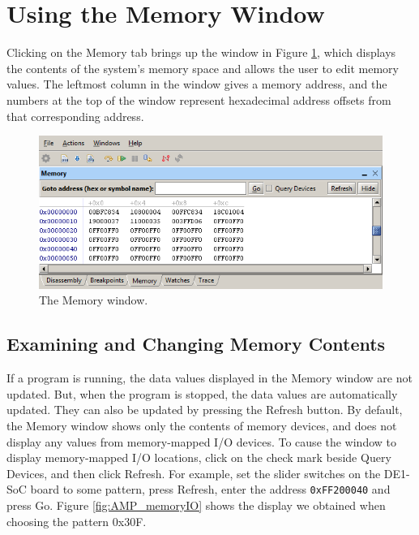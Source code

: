 \documentclass[11pt, twoside, pdftex]{article}
\begin{document}
\section{Using the Memory Window}

Clicking on the {\sf Memory} tab brings up the window in 
Figure \ref{fig:AMP_memorywindow}, which displays the contents
of the system's memory space and allows the user to edit memory
values. The leftmost column in the window gives a memory address,
and the numbers at the top of the window represent hexadecimal
address offsets from that corresponding address. 

\begin{figure}[H]
   \begin{center}
      \includegraphics[scale=0.6]{screenshots/figure36.png}
   \end{center}
   \caption{The Memory window.} 
   \label{fig:AMP_memorywindow}
\end{figure}

\subsection{Examining and Changing Memory Contents}

If a program is running, the data values displayed in the
Memory window are not updated. But, when the program is stopped,
the data values are automatically updated. They can also be
updated by pressing the {\sf Refresh} button. 
By default, the Memory window shows only the contents of memory
devices, and does not display any values from memory-mapped I/O devices. To cause the window to display memory-mapped
I/O locations, click on the check mark beside 
{\sf Query Devices}, and then click 
{\sf Refresh}. For example, set the slider switches on the
DE1-SoC board to some pattern, press {\sf Refresh}, enter the
address \texttt{0xFF200040} and press {\sf Go}. 
Figure \ref{fig:AMP_memoryIO} shows the display we obtained when choosing the pattern
0x30F.
\end{document}
